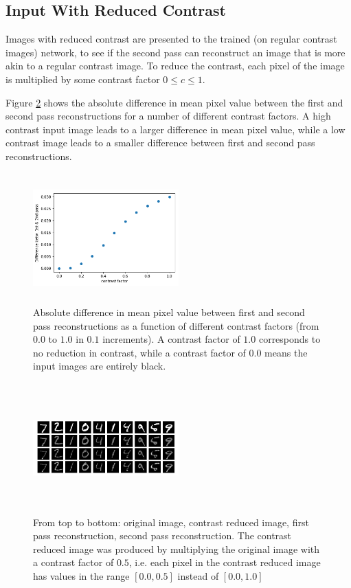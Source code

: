 \documentclass{article}
\begin{document}
  
  
  
 \subsection{Input With Reduced Contrast}
Images with reduced contrast are presented to the trained (on regular contrast images) network, to see if the second pass can reconstruct an image that is more akin to a regular contrast image. To reduce the contrast, each pixel of the image is multiplied by some contrast factor $0 \leq c \leq 1$. 

Figure \ref{fig:contrastdiff} shows the absolute difference in mean pixel value between the first and second pass reconstructions for a number of different contrast factors. A high contrast input image leads to a larger difference in mean pixel value, while a low contrast image leads to a smaller difference between first and second pass reconstructions. 




\begin{figure}[H]
      \centering
      \includegraphics[width=0.5\textwidth,height=5cm,keepaspectratio]{img/appendix/contrast/diff.png}
            \caption{Absolute difference in mean pixel value between first and second pass reconstructions as a function of different contrast factors (from $0.0$ to $1.0$ in $0.1$ increments). A contrast factor of $1.0$ corresponds to no reduction in contrast, while a contrast factor of $0.0$ means the input images are entirely black.}
      \label{fig:contrastdiff}
  \end{figure}
  
  
  \begin{figure}
      \centering
      \includegraphics[width=0.5\textwidth,height=5cm,keepaspectratio]{img/appendix/contrast/contrastrec.png}
            \caption{From top to bottom: original image, contrast reduced image, first pass reconstruction, second pass reconstruction. The contrast reduced image was produced by multiplying the original image with a contrast factor of $0.5$, i.e. each pixel in the contrast reduced image has values in the range $[0.0, 0.5]$ instead of $[0.0, 1.0]$}
      \label{fig:contrastdiff}
  \end{figure}
\end{document}
